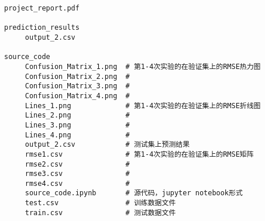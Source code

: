 \documentclass[12pt, a4paper]{ctexart}
\begin{document}
\begin{lstlisting}
project_report.pdf

prediction_results
     output_2.csv

source_code
     Confusion_Matrix_1.png  # 第1-4次实验的在验证集上的RMSE热力图
     Confusion_Matrix_2.png  #
     Confusion_Matrix_3.png  #
     Confusion_Matrix_4.png  #
     Lines_1.png             # 第1-4次实验的在验证集上的RMSE折线图
     Lines_2.png             #
     Lines_3.png             #
     Lines_4.png             #
     output_2.csv            # 测试集上预测结果
     rmse1.csv               # 第1-4次实验的在验证集上的RMSE矩阵
     rmse2.csv               # 
     rmse3.csv               # 
     rmse4.csv               # 
     source_code.ipynb       # 源代码，jupyter notebook形式
     test.csv                # 训练数据文件
     train.csv               # 测试数据文件
\end{lstlisting}




\newpage
\end{document}

